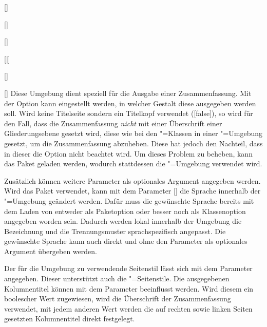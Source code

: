 \begin{Declaration}{[]}
\begin{Declaration}[v2.02]{}
\begin{Declaration}{[]}
\begin{Declaration}[v2.02]{%
  []%
}
\begin{Declaration}[v2.02]{%
  [\PBoolean|]%
}
\begin{Declaration}{[]}
\begin{Declaration}{[\PSet]}
\printdeclarationlist%
%
%
Diese Umgebung dient speziell für die Ausgabe einer Zusammenfassung. Mit der 
Option  kann eingestellt werden, in welcher Gestalt diese 
ausgegeben werden soll. Wird keine Titelseite sondern ein Titelkopf verwendet 
([false]), so wird für den Fall, dass die Zusammenfassung 
\emph{nicht} mit einer Überschrift einer Gliederungsebene gesetzt wird, diese 
wie bei den \KOMAScript"=Klassen in einer "=Umgebung 
gesetzt, um die Zusammenfassung abzuheben. Diese hat jedoch den Nachteil, dass 
in dieser die Option  nicht beachtet wird. Um dieses Problem zu 
beheben, kann das Paket  geladen werden, wodurch stattdessen 
die "=Umgebung verwendet wird.

Zusätzlich können weitere Parameter als optionales Argument angegeben werden. 
Wird das Paket  verwendet, kann mit dem Parameter 
[] die Sprache innerhalb 
der "=Umgebung geändert werden. Dafür muss die gewünschte 
Sprache bereits mit dem Laden von  entweder als Paketoption oder 
besser noch als Klassenoption angegeben worden sein. Dadurch werden lokal 
innerhalb der Umgebung die Bezeichnung  und die 
Trennungsmuster sprachspezifisch angepasst. Die gewünschte Sprache kann auch 
direkt und ohne den Parameter  als 
optionales Argument übergeben werden.

Der für die Umgebung zu verwendende Seitenstil lässt sich mit dem Parameter 
 angegeben. Dieser unterstützt auch die 
"=Seitenstile. Die ausgegebenen Kolumnentitel können mit 
dem Parameter  beeinflusst werden. Wird 
diesem ein boolescher Wert zugewiesen, wird die Überschrift der Zusammenfassung 
verwendet, mit jedem anderen Wert werden die auf rechten sowie linken Seiten  
gesetzten Kolumnentitel direkt festgelegt.


\end{Declaration}
\end{Declaration}
\end{Declaration}
\end{Declaration}
\end{Declaration}
\end{Declaration}
\end{Declaration}
